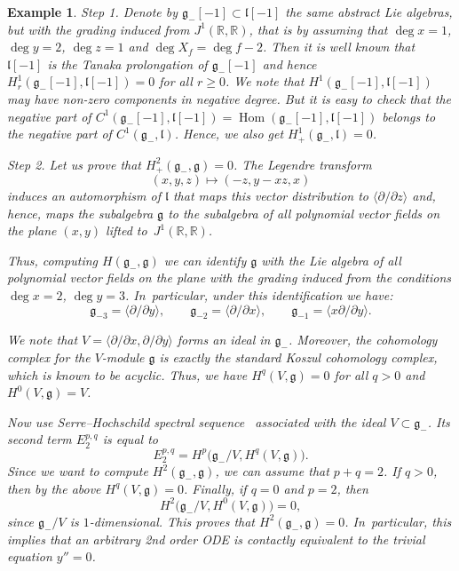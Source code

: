 \documentclass[pdftex]{sigma}%
\newcommand{\R}{\mathbb R}
\newcommand{\g}{\mathfrak g}
\newcommand{\lf}{\mathfrak l}
\newcommand{\Hom}{\operatorname{Hom}}
\newtheorem{ex}[thm]{Example}
\numberwithin{equation}{section}
\begin{document}
\begin{ex}
{}
	
	\textit{Step} 1. Denote by $\g_{-}[-1]\subset \lf[-1]$ the same abstract Lie algebras, but with the gra\-ding induced from $J^1(\R,\R)$, that is by assuming that $\deg x = 1$, $\deg y= 2$, $\deg z= 1$ and $\deg X_f = \deg f - 2$. Then it is well known that $\lf[-1]$ is the Tanaka prolongation of $\g_{-}[-1]$ and hence $H^1_r\left(\g_{-}[-1],\lf[-1]\right)=0$ for all $r\ge 0$. We note that $H^1\left(\g_{-}[-1],\lf[-1]\right)$ may have non-zero components in negative degree. But it is easy to check that the negative part of $C^1\left(\g_{-}[-1],\lf[-1]\right)=\Hom\left(\g_{-}[-1],\lf[-1]\right)$ belongs to the negative part of $C^1(\g_{-},\lf)$. Hence, we also get $H^1_+(\g_{-},\lf)=0$.
	
	\textit{Step} 2. Let us prove that $H^2_{+}(\g_{-},\g)=0$. The Legendre transform
	\[
	(x,y,z) \mapsto (-z, y-xz, x)
	\]
	induces an automorphism of $\lf$ that maps this vector distribution to $\langle \partial/\partial z \rangle$ and, hence, maps the subalgebra $\g$ to the subalgebra of all polynomial vector fields on the plane $(x,y)$ lifted to~$J^1(\R,\R)$.
	
	Thus, computing $H(\g_{-},\g)$ we can identify $\g$ with the Lie algebra of all polynomial vector fields on the plane with the grading induced from the conditions $\deg x = 2$, $\deg y = 3$. In~particular, under this identification we have:
	\[
	\g_{-3} = \langle \partial/\partial y \rangle,\qquad
	\g_{-2} = \langle \partial/\partial x \rangle, \qquad
	\g_{-1} = \langle x\partial/\partial y \rangle.
	\]
	
	We note that $V = \langle \partial/\partial x, \partial/\partial y\rangle$ forms an ideal in $\g_{-}$. Moreover, the cohomology complex for the $V$-module $\g$ is exactly the standard Koszul cohomology complex, which is known to be acyclic. Thus, we have $H^q(V,\g)=0$ for all $q>0$ and $H^0(V,\g) = V$.
	
	Now use Serre--Hochschild spectral sequence~\cite{sh1953} associated with the ideal $V\subset \g_{-}$. Its second term $E_2^{p,q}$ is equal to
	\[
	E_2^{p,q} = H^p \big(\g_{-}/V, H^q(V,\g)\big).
	\]
	Since we want to compute $H^2(\g_{-},\g)$, we can assume that $p+q=2$. If $q>0$, then by the above $H^q(V,\g)=0$. Finally, if $q=0$ and $p=2$, then
	\[
	H^2 \big(\g_{-}/V, H^0(V,\g)\big) = 0,
	\]
	since $\g_{-}/V$ is $1$-dimensional. This proves that $H^2(\g_{-},\g)=0$. In~particular, this implies that an arbitrary 2nd order ODE is contactly
	equivalent to the trivial equation $y''=0$.
	

\end{ex}
\end{document}
